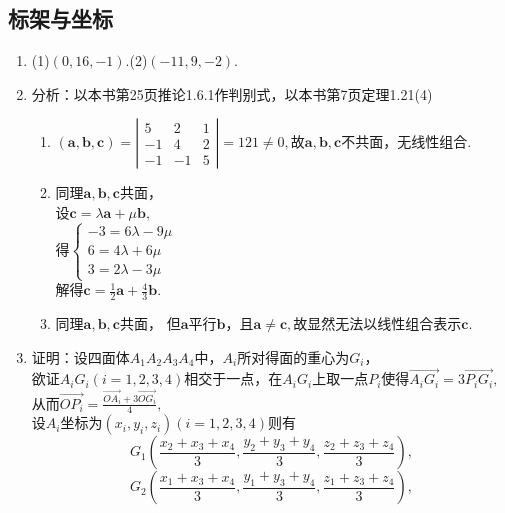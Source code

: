 \documentclass[UTF8]{ctexart}
\begin{document}
\subsection{标架与坐标}
\begin{enumerate}
\item (1)$\left(0,16,-1\right).$(2)$\left(-11,9,-2\right).$

\item 分析：以本书第25页推论1.6.1作判别式，以本书第7页定理1.21(4)\\
\begin{enumerate}[(1)]
\item $\left(\mathbf{a},\mathbf{b},\mathbf{c}\right)=\left|\begin{array}{ccc}5&2&1\\-1&4&2\\-1&-1&5\end{array}\right|=121\neq0,$故$\mathbf{a},\mathbf{b},\mathbf{c}$不共面，无线性组合. \\
\item 同理$\mathbf{a},\mathbf{b},\mathbf{c}$共面，\\
设$\mathbf{c}=\lambda\mathbf{a}+\mu\mathbf{b},$\\
得$\left\{\begin{array}{lll}-3=6\lambda-9\mu\\6=4\lambda+6\mu\\ 3=2\lambda-3\mu\end{array}\right.$\\
解得$\mathbf{c}=\displaystyle\frac{1}{2}\mathbf{a}+\displaystyle\frac{4}{3}\mathbf{b}.$
\item 同理$\mathbf{a},\mathbf{b},\mathbf{c}$共面，
但$\mathbf{a}$平行$\mathbf{b}$，且$\mathbf{a}\neq\mathbf{c},$故显然无法以线性组合表示$\mathbf{c}$. 
\end{enumerate}
\item 证明：设四面体$A_1A_2A_3A_4$中，$A_i$所对得面的重心为$G_i$，\\
欲证$A_{i}G_{i}\left(i=1,2,3,4\right)$相交于一点，在$A_{i}G_{i}$上取一点$P_{i}$使得$\overrightarrow{A_{i}G_{i}}=3\overrightarrow{P_{i}G_{i}},$\\ 
从而$\overrightarrow{OP_{i}}=\displaystyle\frac{\overrightarrow{OA_{i}}+3\overrightarrow{OG_{i}}}{4},$\\
设$A_{i}$坐标为$\left(x_i,y_i,z_i\right)\left(i=1,2,3,4\right)$则有
$$G_{1}\left(\displaystyle\frac{x_2+x_3+x_4}{3},\displaystyle\frac{y_2+y_3+y_4}{3},\displaystyle\frac{z_2+z_3+z_4}{3}\right),$$
$$G_{2}\left(\displaystyle\frac{x_1+x_3+x_4}{3},\displaystyle\frac{y_1+y_3+y_4}{3},\displaystyle\frac{z_1+z_3+z_4}{3}\right),$$

\end{enumerate}
\end{document}
